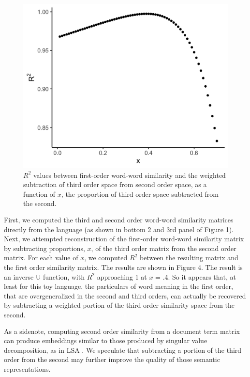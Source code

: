 \documentclass[10pt,letterpaper]{article}
\begin{document}
\begin{figure}
\centering
\includegraphics[width=\linewidth]{ITS_cogsci_files/figure-latex/recon.png}
\caption{\label{fig:firstRecon}\(R^2\) values between first-order word-word similarity and the weighted subtraction of third order space from second order space, as a function of $x$, the proportion of third order space subtracted from the second.}
\end{figure}

First, we computed the third and second order word-word similarity matrices directly from the language (as shown in bottom 2 and 3rd panel of Figure 1). Next, we attempted reconstruction of the first-order word-word similarity matrix by subtracting proportions, $x$, of the third order matrix from the second order matrix. For each value of $x$, we computed $R^2$ between the resulting matrix and the first order similarity matrix. The results are shown in Figure 4. The result is an inverse U function, with \(R^2\) approaching 1 at $x$ = .4. So it appears that, at least for this toy language, the particulars of word meaning in the first order, that are overgeneralized in the second and third orders, can actually be recovered by subtracting a weighted portion of the third order similarity space from the second. 

As a sidenote, computing second order similarity from a document term matrix  \cite{cribbinDiscoveringLatentTopical2011} can produce embeddings similar to those produced by singular value decomposition, as in LSA \cite{landauerSolutionPlatoProblem1997}. We speculate that subtracting a portion of the third order from the second may further improve the quality of those semantic representations.
\end{document}
